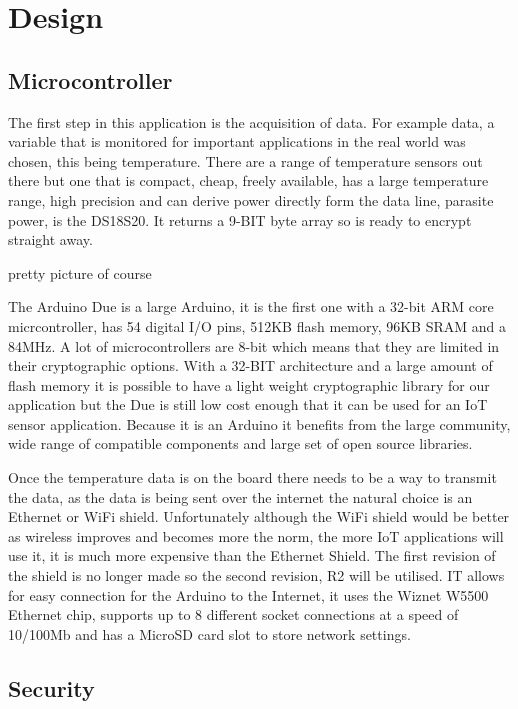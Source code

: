 
\chapter{Design}
\label{design}

\section{Microcontroller}

The first step in this application is the acquisition of data. For example data, a variable that is monitored for important applications in the real world was chosen, this being temperature. There are a range of temperature sensors out there but one that is compact, cheap, freely available, has a large temperature range, high precision and can derive power directly form the data line, parasite power, is the DS18S20. It returns a 9-BIT byte array so is ready to encrypt straight away. 

pretty picture of course

The Arduino Due is a large Arduino, it is the first one with a 32-bit ARM core micrcontroller, has 54 digital I/O pins, 512KB flash memory, 96KB SRAM and a 84MHz. 
A lot of microcontrollers are 8-bit which means that they are limited in their cryptographic options. With a 32-BIT architecture and a large amount of flash memory it is possible to have a light weight cryptographic library for our application but the Due is still low cost enough that it can be used for an IoT sensor application. Because it is an Arduino it benefits from the large community, wide range of compatible components and large set of open source libraries.

Once the temperature data is on the board there needs to be a way to transmit the data, as the data is being sent over the internet the natural choice is an Ethernet or WiFi shield. Unfortunately although the WiFi shield would be better as wireless improves and becomes more the norm, the more IoT applications will use it, it is much more expensive than the Ethernet Shield. The first revision of the shield is no longer made so the second revision, R2 will be utilised. IT allows for easy connection for the Arduino to the Internet, it uses the Wiznet W5500 Ethernet chip, supports up to 8 different socket connections at a speed of 10/100Mb and has a MicroSD card slot to store network settings. 

\section{Security}

